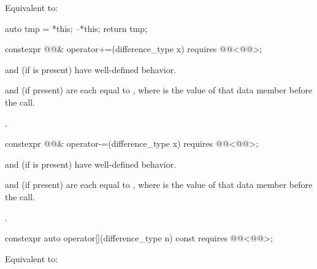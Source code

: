\begin{itemdescr}
\pnum
\effects
Equivalent to:
\begin{codeblock}
auto tmp = *this;
--*this;
return tmp;
\end{codeblock}
\end{itemdescr}

%
\begin{itemdecl}
constexpr @@& operator+=(difference_type x)
  requires @@<@@>;
\end{itemdecl}

\begin{itemdescr}
\pnum
\expects
{} and  (if  is present)
have well-defined behavior.

\pnum
\ensures
{} and  (if present) are
each equal to ,
where  is the value of that data member before the call.

\pnum
\returns
{}.
\end{itemdescr}

%
\begin{itemdecl}
constexpr @@& operator-=(difference_type x)
  requires @@<@@>;
\end{itemdecl}

\begin{itemdescr}
\pnum
\expects
{} and  (if  is present)
have well-defined behavior.

\pnum
\ensures
{} and  (if present) are
each equal to ,
where  is the value of that data member before the call.

\pnum
\returns
{}.
\end{itemdescr}

%
\begin{itemdecl}
constexpr auto operator[](difference_type n) const
  requires @@<@@>;
\end{itemdecl}

\begin{itemdescr}
\pnum
\effects
Equivalent to: 
\end{itemdescr}

